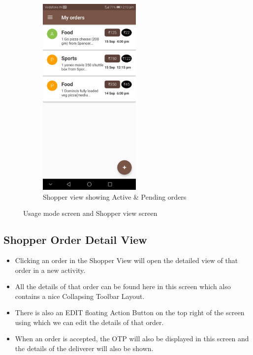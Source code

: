 \documentclass{report}
\begin{document}
\begin{figure}[h!]
\begin{subfigure}[b]{.3\textwidth}
\includegraphics[width=5cm]{shopper_view.jpg}
\caption{\centering \tiny Shopper view showing Active \& Pending orders}
\end{subfigure}
\caption{\tiny Usage mode screen and Shopper view screen} 
\label{fig:NASA_Logo}
\end{figure}



\subsection{Shopper Order Detail View}
\begin{itemize}
\item Clicking an order in the Shopper View will open the detailed view of that order in a new activity.
\item All the details of that order can be found here in this screen which also contains a nice Collapsing Toolbar Layout.
\item There is also an EDIT floating Action Button on the top right of the screen using which we can edit the details of that order.
\item When an order is accepted, the OTP will also be displayed in this screen and the details of the deliverer will also be shown.
\end{itemize}
\end{document}
